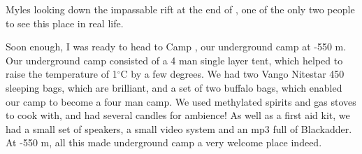 


\begin{marginfigure}
\checkoddpage \ifoddpage \forcerectofloat \else \forceversofloat \fi
\centering
 \caption{Myles looking down the impassable rift at the end of \protect{}, one of the only two people to see this place in real life. }
 \label{stalemate rift}
\end{marginfigure}


Soon enough, I was ready to head to Camp , our underground camp at -550 m. Our underground camp consisted of a 4 man single layer tent, which helped to raise the temperature of 1$^{\circ}$C by a few degrees. We had two Vango Nitestar 450 sleeping bags, which are brilliant, and a set of
two buffalo bags, which enabled our camp to become a four man camp. We used methylated spirits
and gas stoves to cook with, and had several candles for ambience! As well as a first aid kit, we had
a small set of speakers, a small video system and an mp3 full of Blackadder. At -550 m, all this made
underground camp a very welcome place indeed.


